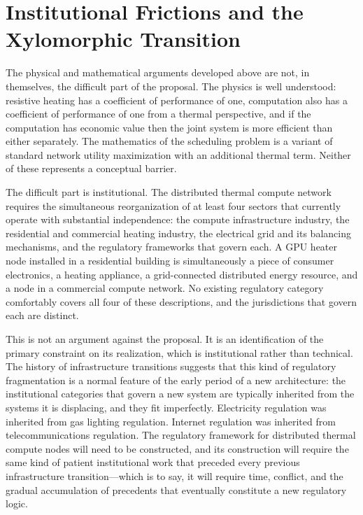 \documentclass[12pt, oneside]{article}
\begin{document}
\section{Institutional Frictions and the Xylomorphic Transition}

The physical and mathematical arguments developed above are not, in themselves, the difficult part of the proposal. The physics is well understood: resistive heating has a coefficient of performance of one, computation also has a coefficient of performance of one from a thermal perspective, and if the computation has economic value then the joint system is more efficient than either separately. The mathematics of the scheduling problem is a variant of standard network utility maximization with an additional thermal term. Neither of these represents a conceptual barrier.

The difficult part is institutional. The distributed thermal compute network requires the simultaneous reorganization of at least four sectors that currently operate with substantial independence: the compute infrastructure industry, the residential and commercial heating industry, the electrical grid and its balancing mechanisms, and the regulatory frameworks that govern each. A GPU heater node installed in a residential building is simultaneously a piece of consumer electronics, a heating appliance, a grid-connected distributed energy resource, and a node in a commercial compute network. No existing regulatory category comfortably covers all four of these descriptions, and the jurisdictions that govern each are distinct.

This is not an argument against the proposal. It is an identification of the primary constraint on its realization, which is institutional rather than technical. The history of infrastructure transitions suggests that this kind of regulatory fragmentation is a normal feature of the early period of a new architecture: the institutional categories that govern a new system are typically inherited from the systems it is displacing, and they fit imperfectly. Electricity regulation was inherited from gas lighting regulation. Internet regulation was inherited from telecommunications regulation. The regulatory framework for distributed thermal compute nodes will need to be constructed, and its construction will require the same kind of patient institutional work that preceded every previous infrastructure transition---which is to say, it will require time, conflict, and the gradual accumulation of precedents that eventually constitute a new regulatory logic.
\end{document}
